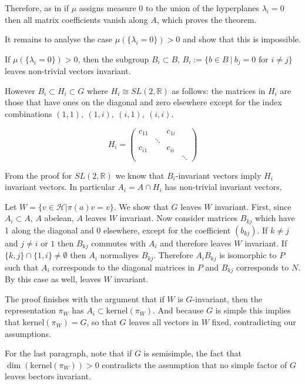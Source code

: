 \documentclass[
  12pt
]{article}
\theoremstyle{break}
\theoremstyle{plain}
\newcommand{\G}{\ensuremath{G}\xspace}
\newcommand{\hilb}{\ensuremath{\mathscr{H}}\xspace}
\newcommand{\sltr}{\ensuremath{SL(2, \mathbb{R})}\xspace}
\begin{document}
  Therefore, as in  if $\mu$ assigns measure $0$ to the union of the hyperplanes $\lambda_i =0$ then all matrix coefficients vanish along $A$, which proves the theorem.

  It remains to analyse the case $\mu(\{\lambda_i=0\}) > 0$ and show that this is impossible.

  If $\mu(\{\lambda_i=0\}) > 0$, then the subgroup $B_i \subset B$, $B_i := \{b \in B\ |\ b_j=0 \text{ for } i\neq j\}$ leaves non-trivial vectors invariant.

  However $B_i \subset H_i \subset G$ where $H_i \cong \sltr$ as follows: the matrices in $H_i$ are those that have ones on the diagonal and zero elsewhere except for the index combinations $(1,1),\ (1,i),\ (i,1),\ (i,i)$.

  $$
  H_i = \begin{pmatrix}
    c_{11} & & c_{1i} & \\
           & \ddots & & \\
    c_{i1} & & c_{ii}&  \\
           & & & \ddots
  \end{pmatrix}
  $$

  From the proof for \sltr we know that $B_i$-invariant vectors imply $H_i$ invariant vectors. In particular $A_i = A \cap H_i$ has non-trivial invariant vectors.

  Let $W = \{v \in \hilb | \pi(a)v=v\}$. We show that \G leaves $W$ invariant.
  First, since $A_i \subset A$, $A$ abelean, $A$ leaves $W$ invariant. Now
  consider matrices $B_{kj}$ which have 1 along the diagonal and 0 elsewhere,
  except for the coefficient $(b_{kj})$. If $k\neq j$ and $j\neq i$ or $1$ then
  $B_{kj}$ commutes with $A_i$ and therefore leaves $W$ invariant. If
  $\{k,j\}\cap \{1,i\} \neq \emptyset$ then $A_i$ normaliyes $B_{kj}$.
  Therefore $A_iB_{kj}$ is isomorphic to $P$ such that $A_i$ corresponds to the
  diagonal matrices in $P$ and $B_{kj}$ corresponds to $N$. By
   this case as well, leaves $W$ invariant.

  The proof finishes with the argument that if $W$ is \G-invariant, then the
  representation $\pi_W$ has $A_i \subset \text{kernel}(\pi_W)$. And because \G
  is simple this implies that $\text{kernel}(\pi_W) = G$, so that \G leaves all
  vectors in $W$ fixed, contradicting our assumptions.

  For the last paragraph, note that if \G is semisimple, the fact that
  $\dim(\text{kernel}(\pi_W)) >0$ contradicts the assumption that no simple
  factor of \G leaves bectors invariant.
\end{document}
